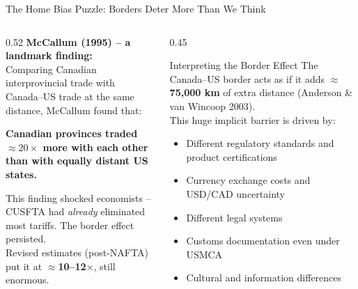 \documentclass[aspectratio=169]{beamer}
\begin{document}
\begin{frame}{The Home Bias Puzzle: Borders Deter More Than We Think}
\begin{columns}[T]
\begin{column}{0.52\textwidth}
\textbf{McCallum (1995) -- a landmark finding:}\\[0.3em]
Comparing Canadian interprovincial trade with Canada–US trade at the same distance, McCallum found that:
\begin{center}
\large\textbf{Canadian provinces traded $\approx20\times$ more with each other than with equally distant US states.}
\end{center}
\vspace{0.2em}
This finding shocked economists -- CUSFTA had \emph{already} eliminated most tariffs. The border effect persisted.\\[0.2em]
Revised estimates (post-NAFTA) put it at $\approx$\textbf{10--12$\times$}, still enormous.
\end{column}
\begin{column}{0.45\textwidth}
\begin{insight}{Interpreting the Border Effect}
\footnotesize The Canada–US border acts as if it adds $\approx$\textbf{75,000 km} of extra distance (Anderson \& van Wincoop 2003).\\[0.3em]
This huge implicit barrier is driven by:
\begin{itemize}\footnotesize
  \item Different regulatory standards and product certifications
  \item Currency exchange costs and USD/CAD uncertainty
  \item Different legal systems 
  \item Customs documentation even under USMCA
  \item Cultural and information differences
\end{itemize}
\end{insight}
\end{column}
\end{columns}
\end{frame}
\end{document}
